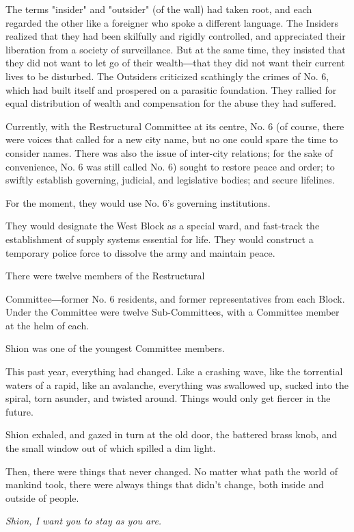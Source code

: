 The terms "insider" and "outsider" (of the wall) had taken root, and
each regarded the other like a foreigner who spoke a different language.
The Insiders realized that they had been skilfully and rigidly
controlled, and appreciated their liberation from a society of
surveillance. But at the same time, they insisted that they did not want
to let go of their wealth―that they did not want their current lives to
be disturbed. The Outsiders criticized scathingly the crimes of No. 6,
which had built itself and prospered on a parasitic foundation. They
rallied for equal distribution of wealth and compensation for the abuse
they had suffered.

Currently, with the Restructural Committee at its centre, No. 6 (of
course, there were voices that called for a new city name, but no one
could spare the time to consider names. There was also the issue of
inter-city relations; for the sake of convenience, No. 6 was still
called No. 6) sought to restore peace and order; to swiftly establish
governing, judicial, and legislative bodies; and secure lifelines.

For the moment, they would use No. 6's governing institutions.~

They would designate the West Block as a special ward, and fast-track
the establishment of supply systems essential for life. They would
construct a temporary police force to dissolve the army and maintain
peace.

There were twelve members of the Restructural~

Committee―former No. 6 residents, and former representatives from each
Block. Under the Committee were twelve Sub-Committees, with a Committee
member at the helm of each.~

Shion was one of the youngest Committee members.

This past year, everything had changed. Like a crashing wave, like the
torrential waters of a rapid, like an avalanche, everything was
swallowed up, sucked into the spiral, torn asunder, and twisted around.
Things would only get fiercer in the future.

Shion exhaled, and gazed in turn at the old door, the battered brass
knob, and the small window out of which spilled a dim light.

Then, there were things that never changed. No matter what path the
world of mankind took, there were always things that didn't change, both
inside and outside of people.

\emph{Shion, I want you to stay as you are.}

